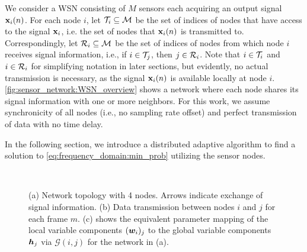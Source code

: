 \documentclass{article}
\begin{document}
We consider a WSN consisting of \(M\) sensors each acquiring an output signal \(\bm{\mathrm{x}}_i(n)\).
For each node \(i\), let \(\mathcal{T}_i \subseteq \mathcal{M}\) be the set of indices of nodes that have access to the signal \(\bm{\mathrm{x}}_i\), i.e. the set of nodes that \(\bm{\mathrm{x}}_i(n)\) is transmitted  to.
Correspondingly, let \(\mathcal{R}_i \subseteq \mathcal{M}\) be the set of indices of nodes from which node \(i\) receives signal information, i.e., if \(i \in \mathcal{T}_j\), then \(j \in \mathcal{R}_i\).
Note that \(i \in \mathcal{T}_i\) and \(i \in \mathcal{R}_i\) for simplifying notation in later sections, but evidently, no actual transmission is necessary, as the signal \(\bm{\mathrm{x}}_i(n)\) is available locally at node \(i\).
\autoref{fig:sensor_network:WSN_overview} shows a network where each node shares its signal information with one or more neighbors.
For this work, we assume synchronicity of all nodes (i.e., no sampling rate offset) and perfect transmission of data with no time delay.

In the following section, we introduce a distributed adaptive algorithm to find a solution to \eqref{eq:frequency_domain:min_prob} utilizing the sensor nodes.

\begin{figure}
    \centering
    \subfloat[][]{\label{fig:sensor_network:WSN_overview}}\hspace*{0.05\columnwidth}
    \subfloat[][]{\label{fig:sensor_network:WSN_detail}}\\
    \vspace*{-0.2cm}
    \vspace*{-0.1cm}
    \caption{(a) Network topology with 4 nodes. Arrows indicate exchange of signal information. (b) Data transmission between nodes \(i\) and \(j\) for each frame \(m\). (c) shows the equivalent parameter mapping of the local variable components \(({{\bm{w}}}_i)_j\) to the global variable components \({\bm{h}}_j\) via \(\mathcal{G}(i,j)\) for the network in (a).}
    \label{fig:sensor_network:WSN_mapping}
\end{figure}
\end{document}
